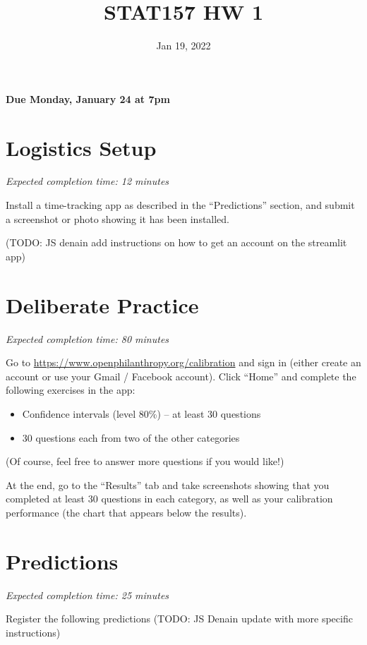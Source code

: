 \documentclass[11pt]{article}
\title{STAT157 HW 1}
\date{Jan 19, 2022}
\begin{document}
\maketitle

\hfill \textbf{Due Monday, January 24 at 7pm}

\section*{Logistics Setup}

\emph{Expected completion time: 12 minutes}

Install a time-tracking app as described in the ``Predictions'' section, and submit a screenshot or photo showing it has been 
installed.

(TODO: JS denain add instructions on how to get an account on the streamlit app)


\section*{Deliberate Practice}

\emph{Expected completion time: 80 minutes}

Go to \url{https://www.openphilanthropy.org/calibration} and sign in (either create an account or use your 
Gmail / Facebook account). Click ``Home'' and complete the following exercises in the app:

\begin{itemize}

\item Confidence intervals (level 80\%) -- at least 30 questions
\item 30 questions each from two of the other categories

\end{itemize}

(Of course, feel free to answer more questions if you would like!)

At the end, go to the ``Results'' tab and take screenshots showing that 
you completed at least 30 questions in each category, as well as your calibration 
performance (the chart that appears below the results).

\section*{Predictions}

\emph{Expected completion time: 25 minutes}

Register the following predictions (TODO: JS Denain update with more specific instructions)
\end{document}
